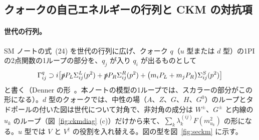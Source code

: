 \documentclass[a4paper,10pt]{ltjsarticle}
\begin{document}
\subsection{クォークの自己エネルギーの行列と CKM の対抗項}\label{sec:se}

\paragraph{世代の行列。}SM ノートの式~(24) を世代の行列に広げ、クォーク $q$（$u$ 型または $d$ 型）の1PI の2点関数の1ループの部分を、$q_j$ が入り $q_i$ が出るものとして
\begin{equation}
\Gamma^q_{ij}\supset i\bigl[\slashed pP_L\Sigma^L_{ij}(p^2)+\slashed pP_R\Sigma^R_{ij}(p^2)+\bigl(m_iP_L+m_jP_R\bigr)\Sigma^S_{ij}(p^2)\bigr]
\label{eq:Gammaq}
\end{equation}
と書く（Denner の形~\cite{denner93}。本ノートの模型の1ループでは、スカラーの部分がこの形になる）。$d$ 型のクォークでは、中性の場（$A$、$Z$、$G$、$H$、$G^0$）のループとタドポールの付いた図は世代について対角で、非対角の成分は $W^\pm$、$G^\pm$ と内線の $u_k$ のループ（図~\ref{fig:ckmdiag} (c)）だけから来て、$\sum_k\lambda^{(ij)}_kF(m_{u_k}^2)$ の形になる。$u$ 型では $V$ と $V^\dagger$ の役割を入れ替える。図の型を図~\ref{fig:seckm} に示す。
\end{document}
